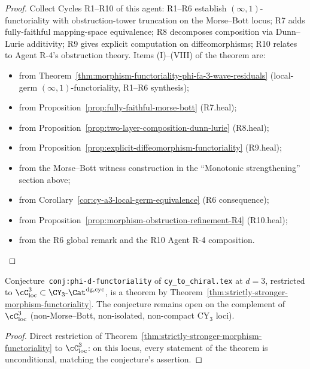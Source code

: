 \begin{proof}[Proof]
Collect Cycles R1--R10 of this agent: R1--R6 establish
$(\infty,1)$-functoriality with obstruction-tower truncation on the
Morse--Bott locus; R7 adds fully-faithful mapping-space equivalence;
R8 decomposes composition via Dunn--Lurie additivity; R9 gives
explicit computation on diffeomorphisms; R10 relates to Agent R-4's
obstruction theory.  Items (I)--(VIII) of the theorem are:
\begin{itemize}
 \item[(I)] from Theorem~\ref{thm:morphism-functoriality-phi-fa-3-wave-residuals}
           (local-germ $(\infty,1)$-functoriality, R1--R6 synthesis);
 \item[(II)] from Proposition~\ref{prop:fully-faithful-morse-bott}
            (R7.heal);
 \item[(III)] from Proposition~\ref{prop:two-layer-composition-dunn-lurie}
            (R8.heal);
 \item[(IV)] from Proposition~\ref{prop:explicit-diffeomorphism-functoriality}
            (R9.heal);
 \item[(V)] from the Morse--Bott witness construction in the
            ``Monotonic strengthening'' section above;
 \item[(VI)] from Corollary~\ref{cor:cy-a3-local-germ-equivalence}
            (R6 consequence);
 \item[(VII)] from Proposition~\ref{prop:morphism-obstruction-refinement-R4}
            (R10.heal);
 \item[(VIII)] from the R6 global remark and the R10 Agent R-4
              composition.
\end{itemize}
\end{proof}

\begin{corollary}
\label{cor:conjecture-theorem-morse-bott}
\ClaimStatusProvedHere
Conjecture~\texttt{conj:phi-d-functoriality} of
\texttt{cy\_to\_chiral.tex} at $d = 3$, restricted to
$\cC_{\mathrm{loc}}^3 \subset \CY_3\text{-}\Cat^{\mathrm{dg}, \mathrm{cyc}}$,
is a theorem by
Theorem~\ref{thm:strictly-stronger-morphism-functoriality}.  The
conjecture remains open on the complement of $\cC_{\mathrm{loc}}^3$
(non-Morse--Bott, non-isolated, non-compact CY$_3$ loci).
\end{corollary}

\begin{proof}
Direct restriction of Theorem~\ref{thm:strictly-stronger-morphism-functoriality}
to $\cC_{\mathrm{loc}}^3$: on this locus, every statement of the
theorem is unconditional, matching the conjecture's assertion.
\end{proof}

